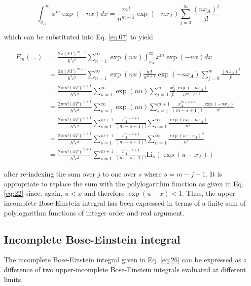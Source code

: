 \documentclass[letterpaper,12pt]{article}
\newcommand{\Li}{\textrm{Li}}
\begin{document}
\begin{equation} \label{eq:31}
\int_{x_{A}}^{\infty} x^{m} \exp(-nx) dx = \frac{m!}{n^{m+1}} \exp(-n x_{A}) \sum_{j = 0}^{m} \frac{(n x_{A})^{j}}{j!}
\end{equation}

which can be substituted into Eq. \ref{eq:07} to yield

\begin{align} \label{eq:32}
F_{m}(\ldots) &= \frac{2\pi (kT)^{m+1}}{h^{3} c^{2}} \sum_{n = 1}^{\infty} \exp(nu) \int_{x_{A}}^{\infty} x^{m} \exp(-nx) dx \nonumber \\
 &= \frac{2\pi (kT)^{m+1}}{h^{3} c^{2}} \sum_{n = 1}^{\infty} \exp(nu) \frac{m!}{n^{m+1}} \exp(-n x_{A}) \sum_{j = 0}^{m} \frac{(n x_{A})^{j}}{j!} \nonumber \\
 &= \frac{2\pi m! (kT)^{m+1}}{h^{3} c^{2}} \sum_{n = 1}^{\infty} \exp(nu) \sum_{j = 0}^{m} \frac{x_{A}^{j}}{j!} \frac{\exp(-n x_{A})}{n^{m-j+1}} \nonumber \\
 &= \frac{2\pi m! (kT)^{m+1}}{h^{3} c^{2}} \sum_{n = 1}^{\infty} \exp(nu) \sum_{s = 1}^{m+1} \frac{x_{A}^{m-s+1}}{(m-s+1)!} \frac{\exp(-n x_{A})}{n^{s}} \nonumber \\
 &= \frac{2\pi m! (kT)^{m+1}}{h^{3} c^{2}} \sum_{s = 1}^{m+1} \frac{x_{A}^{m-s+1}}{(m-s+1)!} \sum_{n = 1}^{\infty} \frac{\exp(nu-n x_{A})}{n^{s}} \nonumber \\
 &= \frac{2\pi m! (kT)^{m+1}}{h^{3} c^{2}} \sum_{s = 1}^{m+1} \frac{x_{A}^{m-s+1}}{(m-s+1)!} \sum_{n = 1}^{\infty} \frac{\exp(u-x_{A})^{n}}{n^{s}} \nonumber \\
 &= \frac{2\pi m! (kT)^{m+1}}{h^{3} c^{2}} \sum_{s = 1}^{m+1} \frac{x_{A}^{m-s+1}}{(m-s+1)!} \Li_{s} \left( \exp(u-x_{A}) \right)
\end{align}

\noindent after re-indexing the sum over $j$ to one over $s$ where $s = m - j + 1$. It is appropriate to replace the sum with the polylogarithm function as given in Eq. \ref{eq:22} since, again, $u < x$ and therefore $\exp(u-x) < 1$. Thus, the upper incomplete Bose-Einstein integral has been expressed in terms of a finite sum of polylogarithm functions of integer order and real argument.

\subsection{Incomplete Bose-Einstein integral}
The incomplete Bose-Einstein integral given in Eq. \ref{eq:26} can be expressed as a difference of two upper-incomplete Bose-Einstein integrals evaluated at different limits.
\end{document}

